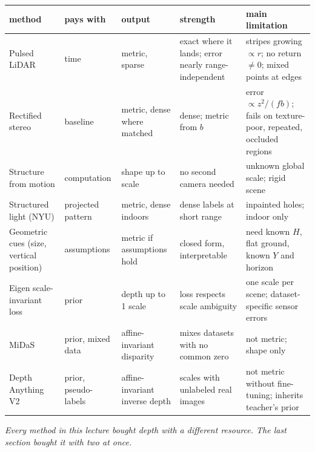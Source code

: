 \documentclass[11pt,a4paper]{article}
\theoremstyle{definition}
\theoremstyle{plain}
\theoremstyle{remark}
\begin{document}
\begin{center}
\scriptsize
\begin{tabularx}{\linewidth}{@{}>{\raggedright\arraybackslash}p{2.6cm}>{\raggedright\arraybackslash}p{1.9cm}>{\raggedright\arraybackslash}p{1.7cm}YY@{}}
\toprule
method & pays with & output & strength & main limitation\\
\midrule
Pulsed LiDAR & time & metric, sparse & exact where it lands; error nearly range-independent & stripes growing $\propto r$; no return $\neq0$; mixed points at edges\\
Rectified stereo & baseline & metric, dense where matched & dense; metric from $b$ & error $\propto z^2/(fb)$; fails on texture-poor, repeated, occluded regions\\
Structure from motion & computation & shape up to scale & no second camera needed & unknown global scale; rigid scene\\
Structured light (NYU) & projected pattern & metric, dense indoors & dense labels at short range & inpainted holes; indoor only\\
Geometric cues (size, vertical position) & assumptions & metric if assumptions hold & closed form, interpretable & need known $H$, flat ground, known $Y$ and horizon\\
Eigen scale-invariant loss & prior & depth up to 1 scale & loss respects scale ambiguity & one scale per scene; dataset-specific sensor errors\\
MiDaS & prior, mixed data & affine-invariant disparity & mixes datasets with no common zero & not metric; shape only\\
Depth Anything V2 & prior, pseudo-labels & affine-invariant inverse depth & scales with unlabeled real images & not metric without fine-tuning; inherits teacher's prior\\
\bottomrule
\end{tabularx}
\end{center}

\vspace{1em}
\noindent %
\emph{Every method in this lecture bought depth with a different resource. The last section bought it with two at once.}
\end{document}
